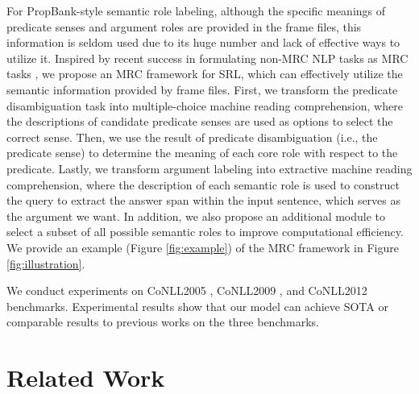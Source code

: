 \documentclass[11pt]{article}
\begin{document}
For PropBank-style semantic role labeling, although the specific meanings of predicate senses and argument roles are provided in the frame files, this information is seldom used due to its huge number and lack of effective ways to utilize it. Inspired by recent success in formulating non-MRC NLP tasks as MRC tasks \cite{levy2017zero, Li2020AUM}, we propose an MRC framework for SRL, which can effectively utilize the semantic information provided by frame files. First, we transform the predicate disambiguation task into multiple-choice machine reading comprehension, where the descriptions of candidate predicate senses are used as options to select the correct sense. Then, we use the result of predicate disambiguation (i.e., the predicate sense) to determine the meaning of each core role with respect to the predicate.
Lastly, we transform argument labeling into extractive machine reading comprehension, where the description of each semantic role is used to construct the query to extract the answer span within the input sentence, which serves as the argument we want. In addition, we also propose an additional module to select a subset of all possible semantic roles to improve computational efficiency. 
We provide an example (Figure \ref{fig:example}) of the MRC framework in Figure \ref{fig:illustration}.
\par



 We conduct experiments on CoNLL2005 \cite{carreras2005introduction}, CoNLL2009 \cite{hajic-etal-2009-conll}, and CoNLL2012 \cite{pradhan2013towards} benchmarks. Experimental results show that our model can achieve SOTA or comparable results to previous works on the three benchmarks. 
 


\section{Related Work}
\end{document}

